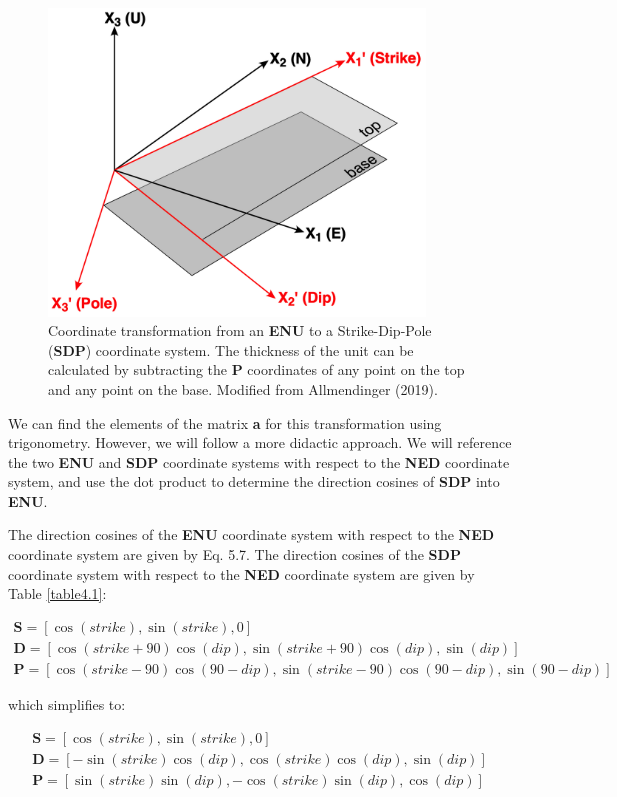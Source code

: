 \documentclass[a4paper , 12pt]{book}
\begin{document}
 \begin{figure}[H]
    \centering
    \includegraphics[width=10cm]{Figures/ch5f3.png}
    \caption{Coordinate transformation from an \textbf{ENU} to a Strike-Dip-Pole (\textbf{SDP}) coordinate system. The thickness of the unit can be calculated by subtracting the \textbf{P} coordinates of any point on the top and any point on the base. Modified from Allmendinger (2019).}
\end{figure}

We can find the elements of the matrix \textbf{a} for this transformation using trigonometry. However, we will follow a more didactic approach. We will reference the two \textbf{ENU} and \textbf{SDP} coordinate systems with respect to the \textbf{NED} coordinate system, and use the dot product to determine the direction cosines of \textbf{SDP} into \textbf{ENU}. 

The direction cosines of the \textbf{ENU} coordinate system with respect to the \textbf{NED} coordinate system are given by Eq. 5.7. The direction cosines of the \textbf{SDP} coordinate system with respect to the \textbf{NED} coordinate system are given by Table \ref{table4.1}:

\begin{gather*}
    \mathbf{S} = [\cos(strike),\sin(strike),0] \\
    \mathbf{D} = [\cos(strike+90)\cos(dip),\sin(strike+90)\cos(dip),\sin(dip)] \\
    \mathbf{P} = [\cos(strike-90)\cos(90-dip),\sin(strike-90)\cos(90-dip),\sin(90-dip)]
\end{gather*}

which simplifies to:

\begin{equation}
    \begin{split}
        \mathbf{S} = [\cos(strike),\sin(strike),0] \hspace{70pt}  \\
        \mathbf{D} = [-\sin(strike)\cos(dip),\cos(strike)\cos(dip),\sin(dip)] \\
        \mathbf{P} = [\sin(strike)\sin(dip),-\cos(strike)\sin(dip),\cos(dip)]
    \end{split}
\end{equation}
\end{document}
